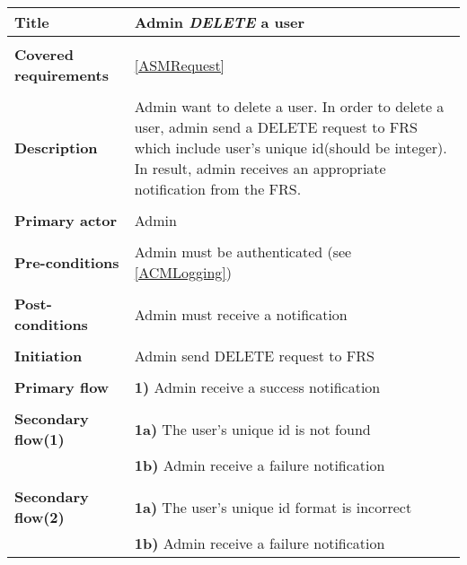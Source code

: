 \documentclass[a4paper,11pt]{article}
\begin{document}
\begin{tabular}{|p{3.5cm}|p{11.5cm}|} \hline
    \textbf{Title} &   Admin \emph{DELETE} a user
        
    \\ \hline \rowcolor{Gray} & \\ \hline
    
    \textbf{Covered requirements} &  \ref{ASMRequest}
        
    \\ \hline \rowcolor{Gray} & \\ \hline
        
    \textbf{Description} &  Admin want to delete a user. In order to delete a user, admin send a DELETE request to FRS which include user's unique id(should be integer). In result, admin receives an appropriate notification from the FRS.
        
    \\ \hline \rowcolor{Gray} & \\ \hline
        
    \textbf{Primary actor} & Admin  
        
    \\ \hline \rowcolor{Gray} & \\ \hline 
          
    \textbf{Pre-conditions} &   Admin must be authenticated (see \ref{ACMLogging})
        
    \\ \hline \rowcolor{Gray} & \\ \hline
         
    \textbf{Post-conditions} &   Admin must receive a notification
        
    \\ \hline \rowcolor{Gray} & \\ \hline 
         
    \textbf{Initiation} & Admin send DELETE request to FRS
        
    \\ \hline \rowcolor{Gray} & \\ \hline 
         
    \textbf{Primary flow} & 
    \textbf{1)} Admin receive a success notification
        
    \\ \hline \rowcolor{Gray} & \\ \hline 
         
    \textbf{Secondary flow(1)} & 
    \textbf{1a)} The user's unique id is not found \\&
    \textbf{1b)} Admin receive a failure notification
     
    \\ \hline \rowcolor{Gray} & \\ \hline 
     
    \textbf{Secondary flow(2)} & 
    \textbf{1a)} The user's unique id format is incorrect \\&
    \textbf{1b)} Admin receive a failure notification
    
    \\ \hline 
\end{tabular}
\end{document}
